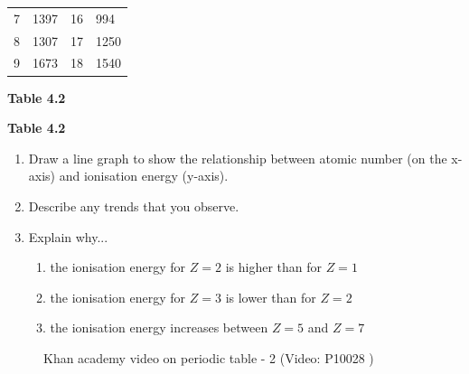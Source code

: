 \begin{table}[H]
\begin{center}
\begin{xtabular}[t]{|l|l|l|l|}
     \tabularnewline{}
        7 &
        1397 &
        16 &
        994%
     \tabularnewline{}
        8 &
        1307 &
        17 &
        1250%
     \tabularnewline{}
        9 &
        1673 &
        18 &
        1540%
     \tabularnewline{}
    \end{xtabular}
      \end{center}
    \begin{center}{\small\bfseries Table 4.2}\end{center}
    \begin{caption}{\small\bfseries Table 4.2}\end{caption}
\end{table}
    \par
        \label{m38757*id262371}\begin{enumerate}[noitemsep, label=\textbf{\arabic*}. ] 
            \label{m38757*uid152}\item Draw a line graph to show the relationship between atomic number (on the x-axis) and ionisation energy (y-axis).
\label{m38757*uid153}\item Describe any trends that you observe.
\label{m38757*uid154}\item Explain why...
\label{m38757*id262412}\begin{enumerate}[noitemsep, label=\textbf{\alph*}. ] 
            \label{m38757*uid155}\item the ionisation energy for $Z=2$ is higher than for $Z=1$
\label{m38757*uid156}\item the ionisation energy for $Z=3$ is lower than for $Z=2$
\label{m38757*uid157}\item the ionisation energy increases between $Z=5$ and $Z=7$
\end{enumerate}
        \end{enumerate}
        \par 
        \label{m38757*eip-6}
    \setcounter{subfigure}{0}
	\begin{figure}[H] %
    \textnormal{Khan academy video on periodic table - 2}\vspace{.1in} \nopagebreak
  \label{m38757*yt-media3}\label{m38757*yt-video3}
             { (Video:  P10028 )}
      \vspace{2pt}
    \vspace{.1in}
 \end{figure}       \par 

